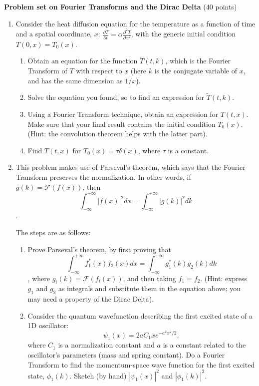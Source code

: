 \documentclass[fleqn]{article}
\begin{document}
  \textbf{Problem set on Fourier Transforms and the Dirac Delta} (40 points)
  \begin{enumerate}

    \item Consider the heat diffusion equation for the temperature as a function of time and a spatial coordinate, $x$: $\frac{\partial T}{\partial t}=\alpha \frac{\partial^2 T}{\partial x^2}$, with the generic initial condition $T(0,x)=T_0(x)$. 
      \begin{enumerate}
        \item Obtain an  equation for the function $\tilde T(t,k)$, which is the Fourier Transform of $T$ with respect to $x$ (here $k$ is the conjugate variable of $x$, and  has the same dimension as $1/x$).
    
        \item Solve the equation you found, so to find an expression for $\tilde T(t,k)$. 
    
        \item Using a Fourier Transform technique, obtain an expression for $T(t,x)$. Make sure that your final result contains the initial condition $T_0(x)$. (Hint: the convolution theorem helps with the latter part). 
    
        \item Find $T(t,x)$ for  $T_0(x)=\tau \delta(x)$, where $\tau$ is a constant. 
      \end{enumerate}
     
    \item This problem makes use of Parseval's theorem, which says that the Fourier Transform preserves the normalization.  In other words, if $g(k) = {\mathcal F}(f(x))$, then $$\int^{+\infty}_{-\infty} |f(x)|^2 dx = \int^{+\infty}_{-\infty} |g(k)|^2 dk$$. 
     
    The steps are as follows:
      \begin{enumerate}
        \item Prove Parseval's theorem, by first proving that $$\int^{+\infty}_{-\infty} f^\ast_1(x)f_2(x) dx = \int^{+\infty}_{-\infty} g^\ast_1(k)g_2(k)dk$$, where $g_i(k) = {\mathcal F}(f_i(x))$, and then taking $f_1=f_2$. (Hint: express $g_1$ and $g_2$ as integrals and substitute them in the equation above; you may need a property of the Dirac Delta). 
    
    
        \item Consider the quantum wavefunction describing the first excited state of a 1D oscillator:
        \[
        \psi _{1}\left( x\right) =2aC_{1}xe^{-a^{2}x^{2}/2},
        \]
        where $C_{1}$ is a normalization constant and $a$ is a constant related to the oscillator's parameters (mass and spring constant).   Do a Fourier Transform to find the
        momentum-space wave function for the first excited state, $\phi _{1}\left(k\right)$. Sketch (by hand)  $|\psi _{1}\left( x\right)|^2$ and $|\phi _{1}\left(k\right)|^2$. 
    

\end{enumerate}
\end{enumerate}
\end{document}

